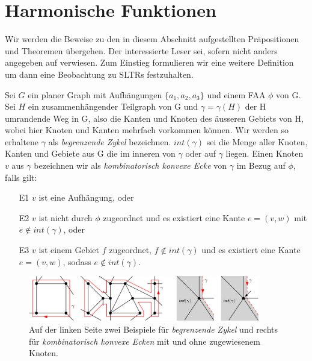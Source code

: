 \section{Harmonische Funktionen}

Wir werden die Beweise zu den in diesem Abschnitt aufgestellten Präpositionen und Theoremen übergehen. Der interessierte Leser sei, sofern nicht anders angegeben auf \cite{af13} verwiesen. Zum Einstieg formulieren wir eine weitere Definition um dann eine Beobachtung zu SLTRs festzuhalten.

\begin{definition}
Sei $G$ ein planer Graph mit Aufhängungen $\{a_1,a_2,a_3\}$ und einem FAA $\phi$ von G. Sei $H$ ein zusammenhängender Teilgraph von G und $\gamma=\gamma(H)$ der H umrandende Weg in G, also die Kanten und Knoten des äusseren Gebiets von H, wobei hier Knoten und Kanten mehrfach vorkommen können. Wir werden so erhaltene $\gamma$ als \textit{begrenzende Zykel} bezeichnen. $int(\gamma)$ sei die Menge aller Knoten, Kanten und Gebiete aus G die im inneren von $\gamma$ oder auf $\gamma$ liegen. Einen Knoten $v$ aus $\gamma$ bezeichnen wir als \textit{kombinatorisch konvexe Ecke} von $\gamma$ im Bezug auf $\phi$, falls gilt:
\begin{itemize}
\item [E1] $v$ ist eine Aufhängung, oder
\item [E2] $v$ ist nicht durch $\phi$ zugeordnet und es existiert eine Kante $e = (v,w)$ mit $e \notin int(\gamma)$, oder
\item [E3] $v$ ist einem Gebiet $f$ zugeordnet, $f \notin int(\gamma)$ und es existiert eine Kante $e = (v,w)$, sodass $e \notin int(\gamma)$.
\end{itemize}

\end{definition}

\begin{figure}[h]
	\centering
  \includegraphics[width=0.9\textwidth]{corner_def.png}
  \caption{Auf der linken Seite zwei Beispiele für \textit{begrenzende Zykel} und rechts für \textit{kombinatorisch konvexe Ecken} mit und ohne zugewiesenem Knoten.}
\end{figure}


